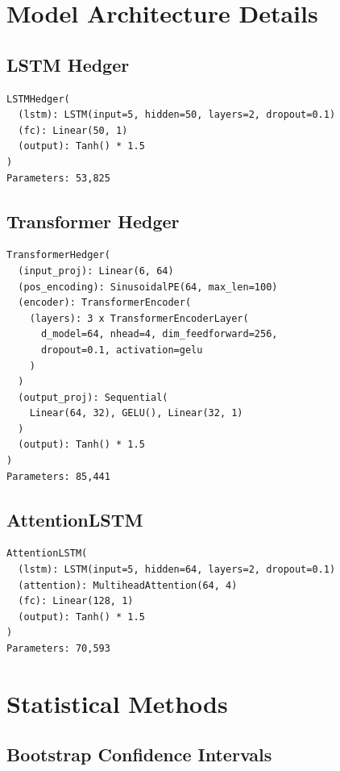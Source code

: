 \section{Model Architecture Details}
\label{app:architectures}

\subsection{LSTM Hedger}

\begin{verbatim}
LSTMHedger(
  (lstm): LSTM(input=5, hidden=50, layers=2, dropout=0.1)
  (fc): Linear(50, 1)
  (output): Tanh() * 1.5
)
Parameters: 53,825
\end{verbatim}

\subsection{Transformer Hedger}

\begin{verbatim}
TransformerHedger(
  (input_proj): Linear(6, 64)
  (pos_encoding): SinusoidalPE(64, max_len=100)
  (encoder): TransformerEncoder(
    (layers): 3 x TransformerEncoderLayer(
      d_model=64, nhead=4, dim_feedforward=256, 
      dropout=0.1, activation=gelu
    )
  )
  (output_proj): Sequential(
    Linear(64, 32), GELU(), Linear(32, 1)
  )
  (output): Tanh() * 1.5
)
Parameters: 85,441
\end{verbatim}

\subsection{AttentionLSTM}

\begin{verbatim}
AttentionLSTM(
  (lstm): LSTM(input=5, hidden=64, layers=2, dropout=0.1)
  (attention): MultiheadAttention(64, 4)
  (fc): Linear(128, 1)
  (output): Tanh() * 1.5
)
Parameters: 70,593
\end{verbatim}

\section{Statistical Methods}
\label{app:statistics}

\subsection{Bootstrap Confidence Intervals}

